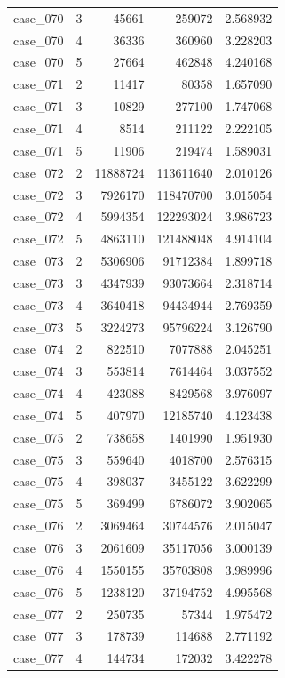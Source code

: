 \begin{longtable}{lrrrr}
case\_070 & 3 & 45661 & 259072 & 2.568932 \\
case\_070 & 4 & 36336 & 360960 & 3.228203 \\
case\_070 & 5 & 27664 & 462848 & 4.240168 \\
case\_071 & 2 & 11417 & 80358 & 1.657090 \\
case\_071 & 3 & 10829 & 277100 & 1.747068 \\
case\_071 & 4 & 8514 & 211122 & 2.222105 \\
case\_071 & 5 & 11906 & 219474 & 1.589031 \\
case\_072 & 2 & 11888724 & 113611640 & 2.010126 \\
case\_072 & 3 & 7926170 & 118470700 & 3.015054 \\
case\_072 & 4 & 5994354 & 122293024 & 3.986723 \\
case\_072 & 5 & 4863110 & 121488048 & 4.914104 \\
case\_073 & 2 & 5306906 & 91712384 & 1.899718 \\
case\_073 & 3 & 4347939 & 93073664 & 2.318714 \\
case\_073 & 4 & 3640418 & 94434944 & 2.769359 \\
case\_073 & 5 & 3224273 & 95796224 & 3.126790 \\
case\_074 & 2 & 822510 & 7077888 & 2.045251 \\
case\_074 & 3 & 553814 & 7614464 & 3.037552 \\
case\_074 & 4 & 423088 & 8429568 & 3.976097 \\
case\_074 & 5 & 407970 & 12185740 & 4.123438 \\
case\_075 & 2 & 738658 & 1401990 & 1.951930 \\
case\_075 & 3 & 559640 & 4018700 & 2.576315 \\
case\_075 & 4 & 398037 & 3455122 & 3.622299 \\
case\_075 & 5 & 369499 & 6786072 & 3.902065 \\
case\_076 & 2 & 3069464 & 30744576 & 2.015047 \\
case\_076 & 3 & 2061609 & 35117056 & 3.000139 \\
case\_076 & 4 & 1550155 & 35703808 & 3.989996 \\
case\_076 & 5 & 1238120 & 37194752 & 4.995568 \\
case\_077 & 2 & 250735 & 57344 & 1.975472 \\
case\_077 & 3 & 178739 & 114688 & 2.771192 \\
case\_077 & 4 & 144734 & 172032 & 3.422278 \\

\end{longtable}
